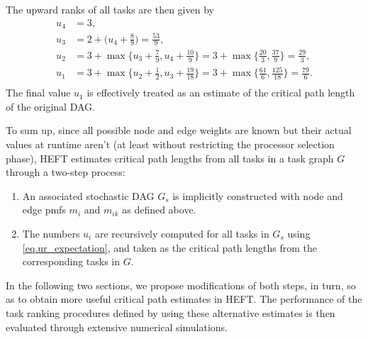 \documentclass[runningheads]{llncs}
\begin{document}
The upward ranks of all tasks are then given by 
\begin{align*}
u_4 &= 3, \\
u_3 &= 2 + \bigg(u_4 + \frac{8}{9}\bigg) = \frac{53}{9}, \\
u_2 &= 3 + \max \bigg \{ u_3 + \frac{7}{9}, u_4 + \frac{10}{9} \bigg \} = 3 + \max \bigg \{ \frac{20}{3}, \frac{37}{9} \bigg \} = \frac{29}{3}, \\
u_1 &= 3 + \max \bigg \{ u_2 + \frac{1}{2}, u_3 + \frac{19}{18} \bigg \} = 3 + \max \bigg \{ \frac{61}{6}, \frac{125}{18} \bigg \} = \frac{79}{6}. \\
\end{align*} 
The final value $u_1$ is effectively treated as an estimate of the critical path length of the original DAG. 

To sum up, since all possible node and edge weights are known but their actual values at runtime aren't (at least without restricting the processor selection phase), HEFT estimates critical path lengths from all tasks in a task graph $G$ through a two-step process:
\begin{enumerate}
	\item An associated stochastic DAG $G_s$ is implicitly constructed with node and edge pmfs $m_i$ and $m_{ik}$ as defined above.   
	\item The numbers $u_i$ are recursively computed for all tasks in $G_s$ using \eqref{eq.ur_expectation}, and taken as the critical path lengths from the corresponding tasks in $G$.      
\end{enumerate}
In the following two sections, we propose modifications of both steps, in turn, so as to obtain more useful critical path estimates in HEFT. The performance of the task ranking procedures defined by using these alternative estimates is then evaluated through extensive numerical simulations.


%
%
%
 
 
\end{document}
